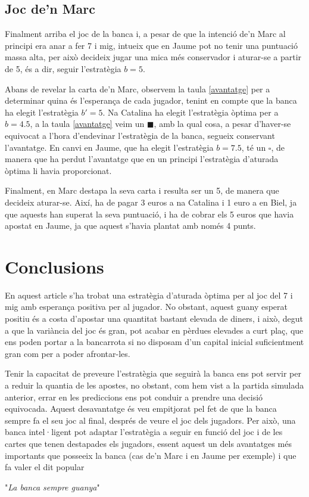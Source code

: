 \documentclass[9pt]{IEEEtran}
\begin{document}
\subsection{Joc de'n Marc}

Finalment arriba el joc de la banca i, a pesar de que la intenció de'n Marc al principi era anar a fer 7 i mig, intueix que en Jaume pot no tenir una puntuació massa alta, per això decideix jugar una mica més conservador i aturar-se a partir de 5, és a dir, seguir l'estratègia $b=5$. 

Abans de revelar la carta de'n Marc, observem la taula \ref{avantatge} per a determinar quina és l'esperança de cada jugador, tenint en compte que la banca ha elegit l'estratègia $b' = 5$. Na Catalina ha elegit l'estratègia òptima per a $b = 4.5$, a la taula \ref{avantatge} veim un $\blacksquare$, amb la qual cosa, a pesar d'haver-se equivocat a l'hora d'endevinar l'estratègia de la banca, segueix conservant l'avantatge. En canvi en Jaume, que ha elegit l'estratègia $b = 7.5$, té un $\square$, de manera que ha perdut l'avantatge que en un principi l'estratègia d'aturada òptima li havia proporcionat.

Finalment, en Marc destapa la seva carta i resulta ser un 5, de manera que decideix aturar-se. Així, ha de pagar 3 euros a na Catalina i 1 euro a en Biel, ja que aquests han superat la seva puntuació, i ha de cobrar els 5 euros que havia apostat en Jaume, ja que aquest s'havia plantat amb només 4 punts.

\section{Conclusions}

En aquest article s'ha trobat una estratègia d'aturada òptima per al joc del 7 i mig amb esperança positiva per al jugador. No obstant, aquest guany esperat positiu és a costa d'apostar una quantitat bastant elevada de diners, i això, degut a que la variància del joc és gran, pot acabar en pèrdues elevades a curt plaç, que ens poden portar a la bancarrota si no disposam d'un capital inicial suficientment gran com per a poder afrontar-les. 

Tenir la capacitat de preveure l'estratègia que seguirà la banca ens pot servir per a reduir la quantia de les apostes, no obstant, com hem vist a la partida simulada anterior, errar en les prediccions ens pot conduir a prendre una decisió equivocada. Aquest desavantatge és veu empitjorat pel fet de que la banca sempre fa el seu joc al final, després de veure el joc dels jugadors. Per això, una banca intel·ligent pot adaptar l'estratègia a seguir en funció del joc i de les cartes que tenen destapades els jugadors, essent aquest un dels avantatges més importants que posseeix la banca (cas de'n Marc i en Jaume per exemple) i que fa valer el dit popular 
\begin{center}
"\textit{La banca sempre guanya}"
\end{center}
\end{document}

